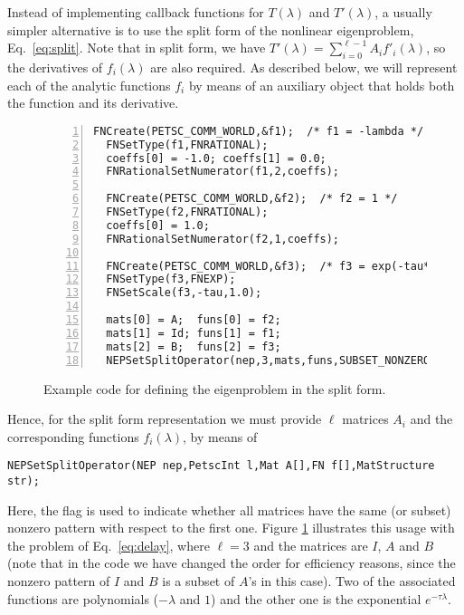 Instead of implementing callback functions for $T(\lambda)$ and $T'(\lambda)$, a usually simpler alternative is to use the split form of the nonlinear eigenproblem, Eq.\ \ref{eq:split}. Note that in split form, we have $T'(\lambda)=\sum_{i=0}^{\ell-1}A_if'_i(\lambda)$, so the derivatives of $f_i(\lambda)$ are also required. As described below, we will represent each of the analytic functions $f_i$ by means of an auxiliary object  that holds both the function and its derivative.

\begin{figure}
\begin{Verbatim}[fontsize=\small,numbers=left,numbersep=6pt,xleftmargin=15mm]
  FNCreate(PETSC_COMM_WORLD,&f1);  /* f1 = -lambda */
  FNSetType(f1,FNRATIONAL);
  coeffs[0] = -1.0; coeffs[1] = 0.0;
  FNRationalSetNumerator(f1,2,coeffs);

  FNCreate(PETSC_COMM_WORLD,&f2);  /* f2 = 1 */
  FNSetType(f2,FNRATIONAL);
  coeffs[0] = 1.0;
  FNRationalSetNumerator(f2,1,coeffs);

  FNCreate(PETSC_COMM_WORLD,&f3);  /* f3 = exp(-tau*lambda) */
  FNSetType(f3,FNEXP);
  FNSetScale(f3,-tau,1.0);

  mats[0] = A;  funs[0] = f2;
  mats[1] = Id; funs[1] = f1;
  mats[2] = B;  funs[2] = f3;
  NEPSetSplitOperator(nep,3,mats,funs,SUBSET_NONZERO_PATTERN);
\end{Verbatim}
\caption{\label{fig:ex-split}Example code for defining the  eigenproblem in the split form.}
\end{figure}

Hence, for the split form representation we must provide $\ell$ matrices $A_i$ and the corresponding functions $f_i(\lambda)$, by means of%
	\begin{Verbatim}[fontsize=\small]
	NEPSetSplitOperator(NEP nep,PetscInt l,Mat A[],FN f[],MatStructure str);
	\end{Verbatim}
Here, the  flag is used to indicate whether all matrices have the same (or subset) nonzero pattern with respect to the first one.
Figure \ref{fig:ex-split} illustrates this usage with the problem of Eq.\ \ref{eq:delay}, where $\ell=3$ and the matrices are $I$, $A$ and $B$ (note that in the code we have changed the order for efficiency reasons, since the nonzero pattern of $I$ and $B$ is a subset of $A$'s in this case). Two of the associated functions are polynomials ($-\lambda$ and $1$) and the other one is the exponential $e^{-\tau\lambda}$.

